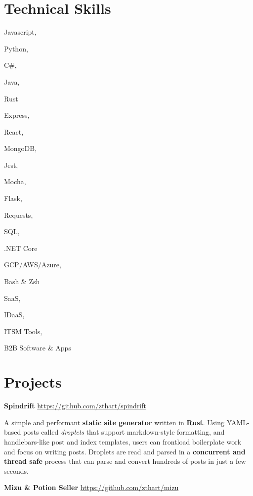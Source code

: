 \documentclass[margin,line]{resume}
\newcommand{\rurl}[1]{\hfill {\footnotesize \url{#1}}}
\begin{document}
\begin{resume}
\section{\mysidestyle Technical Skills}
	\begin{compactdesc}
		\item[Languages] \begin{inparablank} { \small
			\item Javascript,
			\item Python,
			\item C\#,
			\item Java,
			\item Rust
		} \end{inparablank}
        \item[Frameworks, Libraries, \& Tools] \begin{inparablank} { \small
			\item Express,
			\item React,
			\item MongoDB,
			\item Jest,
			\item Mocha,
			\item Flask, 
			\item Requests, 
			\item SQL,
			\item .NET Core
			\item GCP/AWS/Azure,
			\item Bash \& Zsh
        } \end{inparablank}
		\item[Domain Experience] \begin{inparablank} { \small
			\item SaaS,
			\item IDaaS,
			\item ITSM Tools,
			\item B2B Software \& Apps
		} \end{inparablank}
        \normalsize
	\end{compactdesc}

\section{\mysidestyle Projects}
	\begin{asparablank}
		\item {\bf Spindrift} \rurl{https://github.com/zthart/spindrift}

		\small A simple and performant \textbf{static site generator} written in \textbf{Rust}. 
		Using YAML-based posts called \textit{droplets} that support markdown-style formatting, and handlebars-like post and index templates, users can frontload boilerplate work and focus on writing posts.
		Droplets are read and parsed in a \textbf{concurrent and thread safe} process that can parse and convert hundreds of posts in just a few seconds.
		\normalsize
		\\
        \item {\bf Mizu \& Potion Seller } \rurl{https://github.com/zthart/mizu}


\end{asparablank}
\end{resume}
\end{document}
